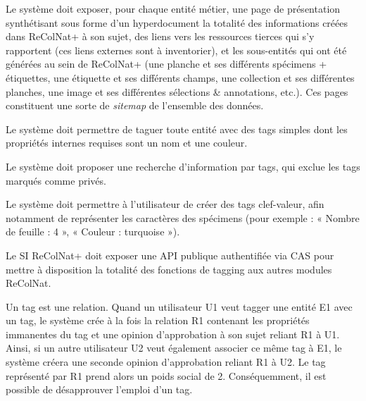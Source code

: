 \exig{}
Le système doit exposer, pour chaque entité métier, une page de présentation synthétisant sous forme d'un hyperdocument la totalité des informations créées dans ReColNat+ à son sujet, des liens vers les ressources tierces qui s'y rapportent (ces liens externes sont à inventorier), et les sous-entités qui ont été générées au sein de ReColNat+ (une planche et ses différents spécimens + étiquettes, une étiquette et ses différents champs, une collection et ses différentes planches, une image et ses différentes sélections & annotations, etc.).
Ces pages constituent une sorte de {\it sitemap} de l'ensemble des données.

\startsection[title={Tags}]

\exig{}
Le système doit permettre de taguer toute entité avec des tags simples dont les propriétés internes requises sont un nom et une couleur.

\exig{}
Le système doit proposer une recherche d'information par tags, qui exclue les tags marqués comme privés.

\exig{}
Le système doit permettre à l'utilisateur de créer des tags clef-valeur, afin notamment de représenter les caractères des spécimens (pour exemple : « Nombre de feuille : 4 », « Couleur : turquoise »).

\exig{}
Le SI ReColNat+ doit exposer une API publique authentifiée via CAS pour mettre à disposition la totalité des fonctions de tagging aux autres modules ReColNat.

\startsubsection[title={Éléments de modélisation}]

Un tag est une relation.
Quand un utilisateur U1 veut tagger une entité E1 avec un tag, le système crée à la fois la relation R1 contenant les propriétés immanentes du tag et une opinion d'approbation à son sujet reliant R1 à U1.
Ainsi, si un autre utilisateur U2 veut également associer ce même tag à E1, le système créera une seconde opinion d'approbation reliant R1 à U2.
Le tag représenté par R1 prend alors un poids social de 2.
Conséquemment, il est possible de désapprouver l'emploi d'un tag.

